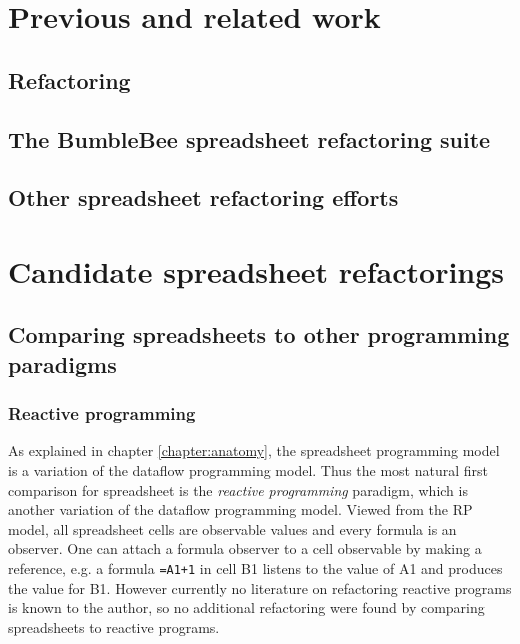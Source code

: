 \documentclass[12pt,a4paper,onecolumn,oneside,parskip]{memoir}
\newcommand{\f}[1]{\texttt{#1}}
\begin{document}


\chapter{Previous and related work}
\label{chapter:previouswork}

\section{Refactoring}

\section{The BumbleBee spreadsheet refactoring suite}

\section{Other spreadsheet refactoring efforts}


\chapter{Candidate spreadsheet refactorings}
\label{chapter:candidaterefactorings}

\section{Comparing spreadsheets to other programming paradigms}

\subsection{Reactive programming}
As explained in chapter \ref{chapter:anatomy}, the spreadsheet programming model is a variation of the dataflow programming model.
Thus the most natural first comparison for spreadsheet is the \emph{reactive programming} paradigm, which is another variation of the dataflow programming model.
Viewed from the RP model, all spreadsheet cells are observable values and every formula is an observer.
One can attach a formula observer to a cell observable by making a reference, e.g. a formula \f{=A1+1} in cell B1 listens to the value of A1 and produces the value for B1.
However currently no literature on refactoring reactive programs is known to the author, so no additional refactoring were found by comparing spreadsheets to reactive programs.
\end{document}
